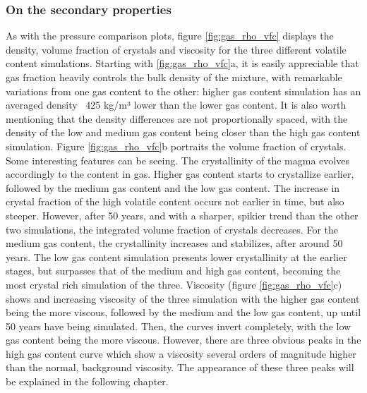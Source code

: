 \subsubsection{On the secondary properties}
As with the pressure comparison plots, figure \ref{fig:gas_rho_vfc} displays the density, volume fraction of crystals and viscosity for the three different volatile content simulations. Starting with \ref{fig:gas_rho_vfc}a, it is easily appreciable that gas fraction heavily controls the bulk density of the mixture, with remarkable variations from one gas content to the other: higher gas content simulation has an averaged density ~425 kg/m³ lower than the lower gas content. It is also worth mentioning that the density differences are not proportionally spaced, with the density of the low and medium gas content being closer than the high gas content simulation. Figure \ref{fig:gas_rho_vfc}b portraits the volume fraction of crystals. Some interesting features can be seeing. The crystallinity of the magma evolves accordingly to the content in gas. Higher gas content starts to crystallize earlier, followed by the medium gas content and the low gas content. The increase in crystal fraction of the high volatile content occurs not earlier in time, but also steeper. However, after 50 years, and with a sharper, spikier trend than the other two simulations, the integrated volume fraction of crystals decreases. For the medium gas content, the crystallinity increases and stabilizes, after around 50 years. The low gas content simulation presents lower crystallinity at the earlier stages, but surpasses that of the medium and high gas content, becoming the most crystal rich simulation of the three. Viscosity (figure \ref{fig:gas_rho_vfc}c) shows and increasing viscosity of the three simulation with the higher gas content being the more viscous, followed by the medium and the low gas content, up until 50 years have being simulated. Then, the curves invert completely, with the low gas content being the more viscous. However, there are three obvious peaks in the high gas content curve which show a viscosity several orders of magnitude higher than the normal, background viscosity. The appearance of these three peaks will be explained in the following chapter. 


